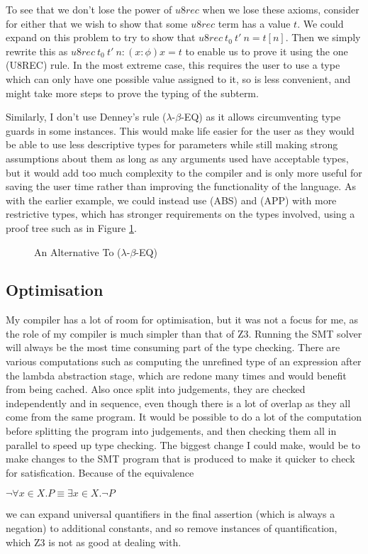 To see that we don't lose the power of $u8rec$ when we lose these axioms, consider for either that
we wish to show that some $u8rec$ term has a value $t$.
We could expand on this problem to try to show that $u8rec\ t_0\ t'\ n = t[n]$.
Then we simply rewrite this as $u8rec\ t_0\ t'\ n: (x: \phi)x = t$ to enable us to prove it using
the one (U8REC) rule.
In the most extreme case, this requires the user to use a type which can only have one possible value
assigned to it, so is less convenient, and might take more steps to prove the typing of the subterm.

Similarly, I don't use Denney's rule ($\lambda$-$\beta$-EQ) as it allows circumventing type guards
in some instances.
This would make life easier for the user as they would be able to use less descriptive types for
parameters while still making strong assumptions about them as long as any arguments used have
acceptable types, but it would add too much complexity to the compiler and is only more useful
for saving the user time rather than improving the functionality of the language.
As with the earlier example, we could instead use (ABS) and (APP) with more restrictive types,
which has stronger requirements on the types involved, using a proof tree such as in Figure
\ref{fig:beta_eq}.

\begin{figure}
    \centering
    \begin{prooftree}
    \end{prooftree}
    \caption{An Alternative To ($\lambda$-$\beta$-EQ)}
    \label{fig:beta_eq}
\end{figure}

\subsection{Optimisation}

My compiler has a lot of room for optimisation, but it was not a focus for me, as the role of my
compiler is much simpler than that of Z3.
Running the SMT solver will always be the most time consuming part of the type checking.
There are various computations such as computing the unrefined type of an expression after the lambda
abstraction stage, which are redone many times and would benefit from being cached.
Also once split into judgements, they are checked independently and in sequence, even though there
is a lot of overlap as they all come from the same program.
It would be possible to do a lot of the computation before splitting the program into judgements,
and then checking them all in parallel to speed up type checking.
The biggest change I could make, would be to make changes to the SMT program that is produced to
make it quicker to check for satisfication.
Because of the equivalence

\begin{center}
    $\lnot \forall x \in X . P \equiv \exists x \in X . \lnot P$
\end{center}

we can expand universal quantifiers in the final assertion (which is always a negation) to additional
constants, and so remove instances of quantification, which Z3 is not as good at dealing with.
